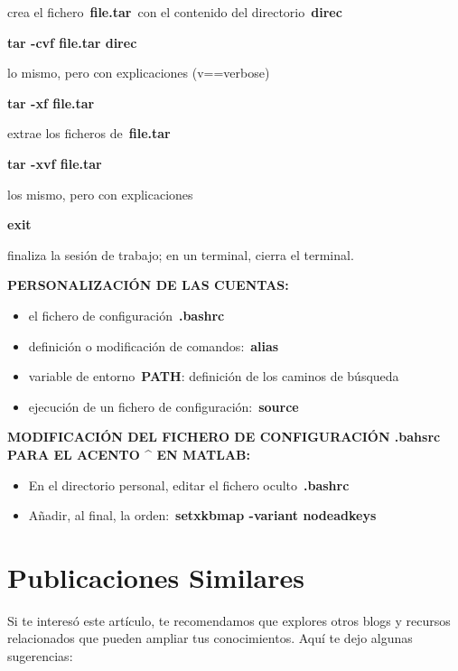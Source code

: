 \documentclass[
  jou,
  floatsintext,
  longtable,
  a4paper,
  nolmodern,
  notxfonts,
  notimes,
  12pt,
  colorlinks=true,linkcolor=blue,citecolor=blue,urlcolor=blue]{apa7}
\providecommand{\tightlist}{%
  \setlength{\itemsep}{0pt}\setlength{\parskip}{0pt}}
\begin{document}
crea el fichero~\textbf{file.tar}~con el contenido del
directorio~\textbf{direc}

\textbf{tar -cvf file.tar direc}

lo mismo, pero con explicaciones (v==verbose)

\textbf{tar -xf file.tar}

extrae los ficheros de~\textbf{file.tar}

\textbf{tar -xvf file.tar}

los mismo, pero con explicaciones

\textbf{exit}

finaliza la sesión de trabajo; en un terminal, cierra el terminal.

\textbf{PERSONALIZACIÓN DE LAS CUENTAS:}

\begin{itemize}
\tightlist
\item
  el fichero de configuración~\textbf{.bashrc}
\item
  definición o modificación de comandos:~\textbf{alias}
\item
  variable de entorno~\textbf{PATH}: definición de los caminos de
  búsqueda
\item
  ejecución de un fichero de configuración:~\textbf{source}
\end{itemize}

\textbf{MODIFICACIÓN DEL FICHERO DE CONFIGURACIÓN .bahsrc PARA EL ACENTO
\^{} EN MATLAB:}

\begin{itemize}
\tightlist
\item
  En el directorio personal, editar el fichero oculto~\textbf{.bashrc}
\item
  Añadir, al final, la orden:~\textbf{setxkbmap -variant nodeadkeys}
\end{itemize}

\section{Publicaciones Similares}\label{publicaciones-similares}

Si te interesó este artículo, te recomendamos que explores otros blogs y
recursos relacionados que pueden ampliar tus conocimientos. Aquí te dejo
algunas sugerencias:
\end{document}
